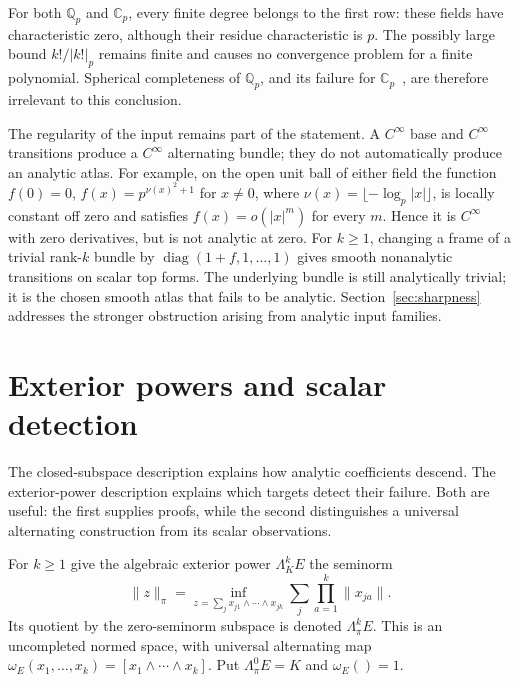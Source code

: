 \documentclass[11pt]{amsart}
\theoremstyle{definition}
\theoremstyle{remark}
\numberwithin{equation}{section}
\newcommand{\abs}[1]{\lvert #1\rvert}
\newcommand{\norm}[1]{\lVert #1\rVert}
\begin{document}
For both $\mathbb Q_p$ and $\mathbb C_p$, every finite degree belongs to the first row: these fields have characteristic zero, although their residue characteristic is $p$. The possibly large bound $k!/\abs{k!}_p$ remains finite and causes no convergence problem for a finite polynomial. Spherical completeness of $\mathbb Q_p$, and its failure for $\mathbb C_p$~\cite[\S1]{Sch}, are therefore irrelevant to this conclusion.

The regularity of the input remains part of the statement. A $C^\infty$ base and $C^\infty$ transitions produce a $C^\infty$ alternating bundle; they do not automatically produce an analytic atlas. For example, on the open unit ball of either field the function $f(0)=0$, $f(x)=p^{\nu(x)^2+1}$ for $x\ne0$, where $\nu(x)=\lfloor-\log_p\abs x\rfloor$, is locally constant off zero and satisfies $f(x)=o(\abs x^m)$ for every $m$. Hence it is $C^\infty$ with zero derivatives, but is not analytic at zero. For $k\ge1$, changing a frame of a trivial rank-$k$ bundle by $\operatorname{diag}(1+f,1,\ldots,1)$ gives smooth nonanalytic transitions on scalar top forms. The underlying bundle is still analytically trivial; it is the chosen smooth atlas that fails to be analytic. Section~\ref{sec:sharpness} addresses the stronger obstruction arising from analytic input families.

\section{Exterior powers and scalar detection}\label{sec:duality}

The closed-subspace description explains how analytic coefficients descend. The exterior-power
description explains which targets detect their failure. Both are useful: the first supplies proofs,
while the second distinguishes a universal alternating construction from its scalar observations.

For $k\ge1$ give the algebraic exterior power $\Lambda^k_KE$ the seminorm
\[
 \norm z_\pi=\inf_{z=\sum_jx_{j1}\wedge\cdots\wedge x_{jk}}
                 \sum_j\prod_{a=1}^k\norm{x_{ja}}.
\]
Its quotient by the zero-seminorm subspace is denoted $\Lambda^k_\pi E$. This is an uncompleted normed
space, with universal alternating map $\omega_E(x_1,\ldots,x_k)=[x_1\wedge\cdots\wedge x_k]$.
Put $\Lambda^0_\pi E=K$ and $\omega_E()=1$.
\end{document}
